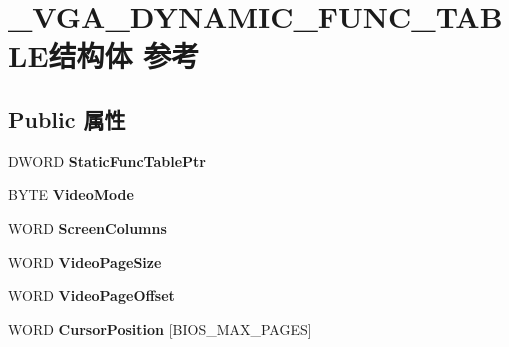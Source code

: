 \hypertarget{struct___v_g_a___d_y_n_a_m_i_c___f_u_n_c___t_a_b_l_e}{}\section{\+\_\+\+V\+G\+A\+\_\+\+D\+Y\+N\+A\+M\+I\+C\+\_\+\+F\+U\+N\+C\+\_\+\+T\+A\+B\+L\+E结构体 参考}
\label{struct___v_g_a___d_y_n_a_m_i_c___f_u_n_c___t_a_b_l_e}
\subsection*{Public 属性}
\begin{DoxyCompactItemize}
\item 
\mbox{\label{struct___v_g_a___d_y_n_a_m_i_c___f_u_n_c___t_a_b_l_e_afbd7ed795f0bf7e313c3dd5475881493}} 
D\+W\+O\+RD {\bfseries Static\+Func\+Table\+Ptr}
\item 
\mbox{\label{struct___v_g_a___d_y_n_a_m_i_c___f_u_n_c___t_a_b_l_e_a1dbf04dbc70ea32836840e7a7468ce2a}} 
B\+Y\+TE {\bfseries Video\+Mode}
\item 
\mbox{\label{struct___v_g_a___d_y_n_a_m_i_c___f_u_n_c___t_a_b_l_e_a7351606a7c9d33eaaca3e4c44b6c3630}} 
W\+O\+RD {\bfseries Screen\+Columns}
\item 
\mbox{\label{struct___v_g_a___d_y_n_a_m_i_c___f_u_n_c___t_a_b_l_e_afbc747d46cbe341b137b26adcc29f031}} 
W\+O\+RD {\bfseries Video\+Page\+Size}
\item 
\mbox{\label{struct___v_g_a___d_y_n_a_m_i_c___f_u_n_c___t_a_b_l_e_a6f3ce8b4e26e3abaff65db38724628a5}} 
W\+O\+RD {\bfseries Video\+Page\+Offset}
\item 
\mbox{\label{struct___v_g_a___d_y_n_a_m_i_c___f_u_n_c___t_a_b_l_e_a9efb8cb89d671e239e34c28d89600614}} 
W\+O\+RD {\bfseries Cursor\+Position} \mbox{[}B\+I\+O\+S\+\_\+\+M\+A\+X\+\_\+\+P\+A\+G\+ES\mbox{]}

\end{DoxyCompactItemize}
